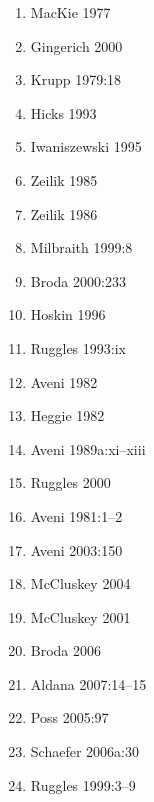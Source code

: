 \begin{enumerate}
    \item MacKie 1977
    \item Gingerich 2000
    \item Krupp 1979:18
    \item Hicks 1993
    \item Iwaniszewski 1995
    \item Zeilik 1985
    \item Zeilik 1986
    \item Milbraith 1999:8
    \item Broda 2000:233
    \item Hoskin 1996
    \item Ruggles 1993:ix
    \item Aveni 1982
    \item Heggie 1982
    \item Aveni 1989a:xi–xiii
    \item Ruggles 2000
    \item Aveni 1981:1–2
    \item Aveni 2003:150
    \item McCluskey 2004
    \item McCluskey 2001
    \item Broda 2006
    \item Aldana 2007:14–15
    \item Poss 2005:97
    \item Schaefer 2006a:30
    \item Ruggles 1999:3–9
\end{enumerate}


